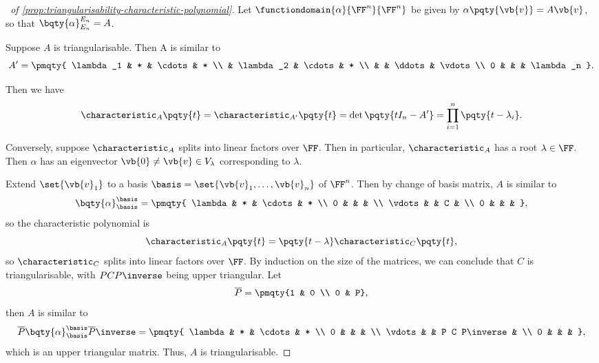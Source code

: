 \begin{proof}[\proofname\ of \autoref{prop:triangularisability-characteristic-polynomial}]
    Let \(\functiondomain{\alpha}{\FF^n}{\FF^n}\) be given by \(\alpha\pqty{\vb{v}} = A\vb{v}\), so that \(\bqty{\alpha}_{E_n}^{E_n} = A\).

    Suppose \(A\) is triangularisable. Then A is similar to
    \[
        A' = \pmqty{
            \lambda_1 & * & \cdots & * \\
             & \lambda_2 & \cdots & * \\
             & & \ddots & \vdots \\
            0 & & & \lambda_n
        }.
    \]

    Then we have
    \[
        \characteristic_{A} \pqty{t} = \characteristic_{A'} \pqty{t} = \det\pqty{t I_n - A'} = \prod_{i = 1}^{n} \pqty{t - \lambda_i}.
    \]

    Conversely, suppose \(\characteristic_{A}\) splits into linear factors over \(\FF\). Then in particular, \(\characteristic_{A}\) has a root \(\lambda \in \FF\). Then \(\alpha\) has an eigenvector \(\vb{0} \neq \vb{v} \in V_{\lambda}\) corresponding to \(\lambda\).

    Extend \(\set{\vb{v}_1}\) to a basis \(\basis = \set{\vb{v}_1, \ldots, \vb{v}_n}\) of \(\FF^n\). Then by change of basis matrix, \(A\) is similar to
    \[
        \bqty{\alpha}_{\basis}^{\basis} = \pmqty{
            \lambda & * & \cdots & * \\
            0 &  &  &  \\
            \vdots &  & C &  \\
            0 &  &  &
        },
    \]
    so the characteristic polynomial is
    \[
        \characteristic_{A} \pqty{t} = \pqty{t - \lambda} \characteristic_C \pqty{t},
    \]
    so \(\characteristic_C\) splits into linear factors over \(\FF\). By induction on the size of the matrices, we can conclude that \(C\) is triangularisable, with \(P C P\inverse\) being upper triangular. Let
    \[
        \overline{P} = \pmqty{1 & 0 \\ 0 & P},
    \]
    then \(A\) is similar to
    \[
        \overline{P} \bqty{\alpha}_{\basis}^{\basis} \overline{P}\inverse = \pmqty{
            \lambda & * & \cdots & * \\
            0 &  &  &  \\
            \vdots &  & P C P\inverse &  \\
            0 &  &  &
        },
    \]
    which is an upper triangular matrix. Thus, \(A\) is triangularisable.
\end{proof}

